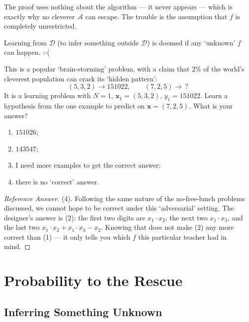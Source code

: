 The proof uses nothing about the algorithm --- it never appears --- which is
exactly why no cleverer \(\mathcal{A}\) can escape. The trouble is the
assumption that \(f\) is completely unrestricted.

\begin{moral}
    Learning from \(\mathcal{D}\) (to infer something outside \(\mathcal{D}\))
    is doomed if any `unknown' \(f\) can happen. :-(
\end{moral}

\begin{exercise}
    This is a popular `brain-storming' problem, with a claim that \(2\%\) of the
    world's cleverest population can crack its `hidden pattern':
    \[
        (5, 3, 2) \to 151022, \qquad (7, 2, 5) \to \,?
    \]
    It is a learning problem with \(N = 1\), \(\bm{x}_1 = (5,3,2)\), \(y_1 =
    151022\). Learn a hypothesis from the one example to predict on
    \(\bm{x} = (7,2,5)\). What is your answer?
    \begin{enumerate}[(1)]
        \item \(151026\);
        \item \(143547\);
        \item I need more examples to get the correct answer;
        \item there is no `correct' answer.
    \end{enumerate}
\end{exercise}

\begin{proof}[Reference Answer]
    (4). Following the same nature of the no-free-lunch problems discussed, we
    cannot hope to be correct under this `adversarial' setting. The designer's
    answer is (2): the first two digits are \(x_1 \cdot x_2\), the next two
    \(x_1 \cdot x_3\), and the last two \(x_1 \cdot x_2 + x_1 \cdot x_3 - x_2\).
    Knowing that does not make (2) any more correct than (1) --- it only tells
    you which \(f\) this particular teacher had in mind.
\end{proof}

\section{Probability to the Rescue}\label{sec:hoeffding}


\subsection{Inferring Something Unknown}

